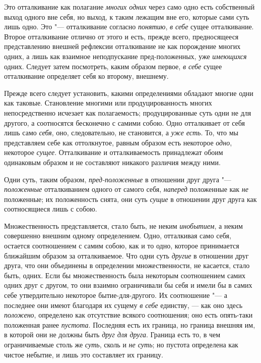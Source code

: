 Это отталкивание как полагание {\em многих одних} через
само одно есть собственный выход одного вне себя, но выход, к таким лежащим
вне его, которые сами суть лишь одно. Это "--- отталкивание согласно
{\em понятию}, {\em в себе} сущее
отталкивание. Второе отталкивание отлично от этого и есть, прежде всего,
предносящееся представлению внешней рефлексии отталкивание не как
порождение многих одних, а лишь как взаимное неподпускание пред-положенных,
уже {\em имеющихся} одних. Следует затем посмотреть,
каким образом первое, {\em в себе} сущее отталкивание
определяет себя ко второму, внешнему.

Прежде всего следует установить, какими определениями обладают многие одни
как таковые. Становление многими или продуцированность многих
непосредственно исчезает как полагаемость; продуцированные суть одни не для
другого, а соотносятся бесконечно с самими собою. Одно отталкивает от себя
лишь само {\em себя}, оно, следовательно, не
становится, а {\em уже есть}. То, что мы представляем
себе как оттолкнутое, равным образом есть некоторое
{\em одно}, некоторое {\em сущее}.
Отталкивание и отталкиваемость принадлежат обоим одинаковым образом и не
составляют никакого различия между ними.

Одни суть, таким образом, {\em пред-положенные} в
отношении друг друга "--- {\em положенные} отталкиванием
одного от самого себя, {\em наперед} положенные как
{\em не} положенные; их положенность снята, они суть
{\em сущие} в отношении друг друга как соотносящиеся
лишь с собою.

Множественность представляется, стало быть, не неким
{\em инобытием}, а неким совершенно внешним одному
определением. Одно, отталкивая само себя, остается соотношением с самим
собою, как и то одно, которое принимается ближайшим образом за
отталкиваемое. Что одни суть {\em другие} в отношении
друг друга, что они объединены в определении множественности, не касается,
стало быть, одних. Если бы множественность была некоторым соотношением
самих одних друг с другом, то они взаимно ограничивали бы себя и имели бы в
самих себе утвердительно некоторое бытие-для-другого. Их соотношение "--- а
последнее они имеют благодаря их сущему {\em в себе}
единству, — как оно здесь {\em положено}, определено
как отсутствие всякого соотношения; оно есть опять-таки положенная ранее
{\em пустота}. Последняя есть их граница, но граница
внешняя им, в которой они не должны быть {\em друг для
друга}. Граница есть то, в чем ограничиваемые столь же
{\em суть}, сколь и {\em не суть};
но пустота определена как чистое небытие, и лишь это составляет их границу.


